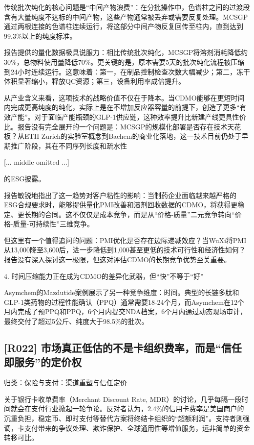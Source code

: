 \documentclass[11pt]{ctexart}
\begin{document}
传统批次纯化的核心问题是“中间产物浪费”：在分批操作中，色谱柱之间的过渡段含有大量纯度不达标的中间产物，这些产物通常被丢弃或需要反复处理。MCSGP通过两根连接的色谱柱连续运行，将这部分中间产物反复回传至柱内，直到达到99.3\%以上的纯度标准。

报告提供的量化数据极具说服力：相比传统批次纯化，MCSGP将溶剂消耗降低约30\%，总物料使用量降低70\%。更关键的是，原本需要5天的批次纯化流程被压缩到24小时连续运行。这意味着：第一，在制品控制检查次数大幅减少；第二，冻干体积显著缩小，释放QC资源；第三，设备利用率成倍提升。

从产业含义来看，这项技术的战略价值不仅在于降本。当CDMO能够在更短时间内完成更高纯度的纯化，实际上是在不增加反应器容量的前提下，创造了更多“有效产能”。对于面临产能瓶颈的GLP-1供应链，这种效率提升比新建产线更具性价比。报告没有完全展开的一个问题是：MCSGP的规模化部署是否存在技术天花板？从ETH Zurich的实验室概念到Bachem的商业化落地，这一技术目前仍处于早期推广阶段，其在不同序列长度和疏水性

[... middle omitted ...]

的ESG披露。

报告敏锐地指出了这一趋势对客户粘性的影响：当制药企业面临越来越严格的ESG合规要求时，能够提供量化PMI改善和溶剂回收数据的CDMO，将获得更稳定、更长期的合同。这不仅仅是成本竞争，而是从“价格-质量”二元竞争转向“价格-质量-可持续性”三维竞争。

但这里有一个值得追问的问题：PMI优化是否存在边际递减效应？当WuXi将PMI从13,000降至3,600后，进一步降低到1,000甚至更低的技术可行性和经济性如何？报告没有深入探讨这一极限，但这对评估CDMO的长期竞争优势至关重要。

4. 时间压缩能力正在成为CDMO的差异化武器，但“快”不等于“好”

Asymchem的Mazdutide案例展示了另一种竞争维度：时间。典型的长链多肽和GLP-1类药物的过程性能确认（PPQ）通常需要18-24个月，而Asymchem在12个月内完成了预PPQ和PPQ，6个月内提交NDA档案，6个月内通过动态现场审计，最终交付了超过5公斤、纯度大于98.5\%的批次。

\subsection{[R022] 市场真正低估的不是卡组织费率，而是“信任即服务”的定价权}
{\small\color{refgray}归类：保险与支付：渠道重塑与信任定价}

关于银行卡收单费率（Merchant Discount Rate, MDR）的讨论，几乎每隔一段时间就会在支付行业掀起一轮争论。反对者认为，2.4\%的信用卡费率是美国商户的沉重负担，稳定币、即时支付等替代方案将终结卡组织的“超额利润”。支持者则强调，卡支付带来的争议处理、欺诈保护、全球通用性等增值服务，远非简单的资金转移可比。
\end{document}
